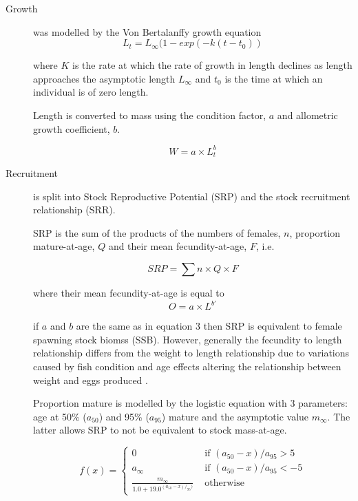 \documentclass[10pt]{article}
\begin{document}
\begin{description}
    \item[Growth] was modelled by the Von Bertalanffy growth equation \cite{von1957quantitative}
      \begin{equation} L_t = L_{\infty}(1 - exp(-k(t-t_0)) \end{equation}
         
where $K$ is the rate at which the rate of growth in length declines as length approaches the asymptotic length  $L_{\infty}$ 
and $t_{0}$ is the time at which an individual is of zero length. 

Length is converted to mass using the condition factor, $a$ and allometric growth coefficient, $b$.

\begin{equation} W = a \times L_t^b \end{equation}

 \item[Recruitment] is split into Stock Reproductive Potential (SRP) and the stock recruitment relationship (SRR).

SRP is the sum of the products of the numbers of females, $n$, proportion mature-at-age, $Q$ and their mean fecundity-at-age, $F$, i.e. 

   \begin{equation} SRP = \sum{n \times Q \times F } \end{equation}

where their mean fecundity-at-age is equal to 
\begin{equation} O	 = a \times L^{b\prime} \end{equation}

if $a$ and $b$ are the same as in equation 3 then SRP is equivalent to female spawning stock biomss (SSB). However, generally the 
fecundity to length relationship differs from the weight to length relationship due to variations caused by fish condition and age 
effects altering the relationship between weight and eggs produced \cite{perez2012study}.

Proportion mature is modelled by the logistic equation with 3 parameters: age at 50\% ($a_{50}$) and 95\% ($a_{95}$) mature and the asymptotic value $m_{\infty}$. The 
latter allows SRP to not be equivalent to stock mass-at-age.

\begin{equation}
f(x) = \left\{ \begin{array}{ll}
			0                                 &\mbox{ if $(a_{50}-x)/a_{95} >  5$} \\
			a_{\infty}                        &\mbox{ if $(a_{50}-x)/a_{95} < -5$} \\
			\frac{m_{\infty}}{1.0+19.0^{(a_{50}-x)/_{95})}} &\mbox{ otherwise}
		\end{array}
       \right.
\end{equation}


\end{description}
\end{document}
